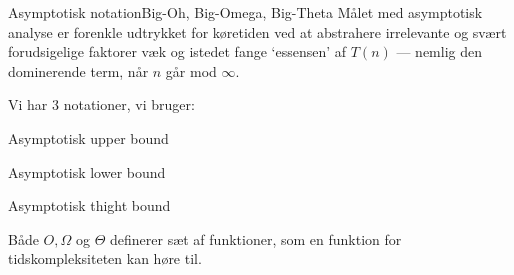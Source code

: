 \documentclass[aspectratio=1610]{beamer}
\begin{document}
\begin{frame}{Asymptotisk notation}{Big-Oh, Big-Omega, Big-Theta}
    Målet med asymptotisk analyse er forenkle udtrykket for køretiden ved at
    abstrahere irrelevante og svært forudsigelige faktorer væk og istedet fange
    `essensen' af $T(n)$ --- nemlig den dominerende term, når $n$ går mod
    $\infty$.

    \pause
    \medskip

    Vi har 3 notationer, vi bruger:

    \begin{description}
        \item[Big-Oh, $O$] Asymptotisk \alert{upper bound}
        \item[Big-Omega, $\Omega$] Asymptotisk \alert{lower bound}
        \item[Big-Theta, $\Theta$] Asymptotisk \alert{thight bound}
    \end{description}

    Både $O, \Omega$ og $\Theta$ definerer \alert{sæt af funktioner}, som en
    funktion for tidskompleksiteten kan høre til.
\end{frame}
\end{document}
